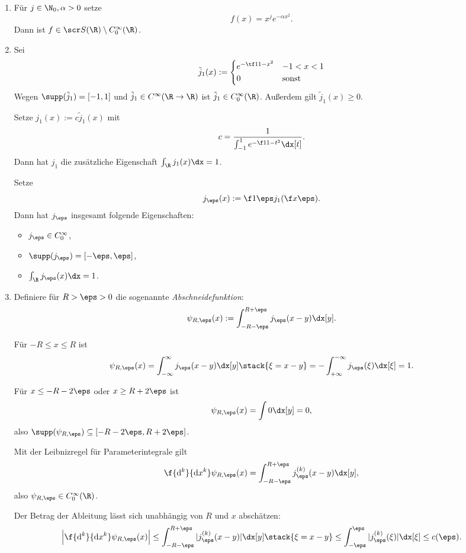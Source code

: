 \begin{ex} \label{4.2}
	\begin{enumerate}[1)]
		\item
			Für $j \in \N_0, \alpha > 0$ setze
			\[
				f(x) = x^j e^{-\alpha x^2}.
			\]
			Dann ist $f \in \scr S(\R) \setminus C_0^\infty (\R)$.
		\item
			Sei
			\[
				\tilde j_1(x) := \begin{cases}
					e^{-\tf 1{1-x^2}} & -1 < x < 1 \\
					0 & \text{sonst}
				\end{cases}
			\]
			Wegen $\supp(\tilde j_1) = [-1,1]$ und $\tilde j_1 \in C^\infty(\R \to \R)$ ist $\tilde j_1 \in C_0^\infty(\R)$.
			Außerdem gilt $\tilde j_1(x) \ge 0$.

			Setze $j_1(x) := c \tilde j_1(x)$ mit
			\[
				c = \dfrac 1{\int_{-1}^1 e^{- \f 1{1-t^2}} \dx[t]}.
			\]
			Dann hat $j_1$ die zusätzliche Eigenschaft $\int_{\R} j_1(x) \dx = 1$.

			Setze
			\[
				j_\eps(x) := \f 1\eps j_1(\f x\eps).
			\]
			Dann hat $j_\eps$ insgesamt folgende Eigenschaften:
			\begin{itemize}
				\item
					$j_\eps \in C_0^\infty$,
				\item
					$\supp(j_\eps) = [-\eps,\eps]$,
				\item
					$\int_\R j_\eps(x) \dx = 1$.
			\end{itemize}
		\item
			Definiere für $R > \eps > 0$ die sogenannte \emph{Abschneidefunktion}:
			\[
				\psi_{R, \eps}(x) := \int_{-R-\eps}^{R+ \eps} j_\eps(x-y) \dx[y].
			\]

			Für $-R \le x \le R$ ist
			\begin{align*}
				\psi_{R, \eps}(x)
				= \int_{-\infty}^\infty j_\eps(x-y) \dx[y]
				\stack{\xi = x-y} = -\int_{+\infty}^{-\infty}  j_\eps (\xi) \dx[\xi]
				= 1.
			\end{align*}

			Für $x \le - R - 2\eps$ oder $x \ge R + 2\eps$ ist
			\[
				\psi_{R,\eps}(x) = \int 0 \dx[y] = 0,
			\]
			also $\supp (\psi_{R,\eps}) \subset [-R-2\eps, R+2\eps]$.

			Mit der Leibnizregel für Parameterintegrale gilt
			\[
				\f {\mathrm{d}^k}{\mathrm{d}x^k} \psi_{R,\eps}(x)
				= \int_{-R-\eps}^{R+\eps} j_\eps^{(k)} (x-y) \dx[y],
			\]
			also $\psi_{R,\eps} \in C_0^\infty (\R)$.

			Der Betrag der Ableitung lässt sich unabhängig von $R$ und $x$ abschätzen:
			\begin{align*}
				\Big| \f {\mathrm{d}^k}{\mathrm{d}x^k} \psi_{R,\eps}(x) \Big|
				\le \int_{-R-\eps}^{R+\eps} |j_\eps^{(k)}(x-y)| \dx[y]
				\stack{\xi = x-y}\le \int_{-\eps}^\eps |j_\eps^{(k)}(\xi)| \dx[\xi]
				\le c(\eps).
			\end{align*}
	\end{enumerate}
\end{ex}

